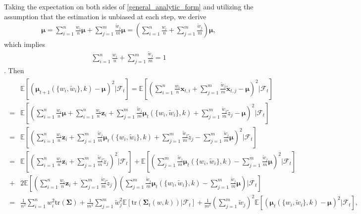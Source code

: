 Taking the expectation on both sides of \eqref{general_analytic_form} and utilizing the assumption that the estimation is unbiased at each step, we derive
\begin{align*}
\boldsymbol{\mu} = \sum_{i=1}^{n} \frac{w_i}{n} \boldsymbol{\mu} + \sum_{j=1}^{m} \frac{\widetilde{w}_j}{m} \boldsymbol{\mu}=(\sum_{i=1}^{n}\frac{w_i}{n}+\sum_{j=1}^{m}\frac{\widetilde{w}_j}{m})\boldsymbol{\mu},
\end{align*}
which implies 
\begin{align}
\label{unbiased_corollary}
\sum_{i=1}^{n}\frac{w_i}{n}+\sum_{j=1}^{m}\frac{\widetilde{w}_j}{m}=1
\end{align}.
Then 
\begin{align}
\label{general_stepbystep_cal}
\begin{split}
& \mathbb{E}[(\bm{\mu}_{t+1}(\{{w}_i, \widetilde{w}_i\}, k)-\bm{\mu})^2|\mathcal{F}_t]=\mathbb{E}[(\sum_{i=1}^{n}\frac{w_i}{n}\boldsymbol{x}_{t,i}+\sum_{j=1}^{m}\frac{\widetilde{w}_j}{m}\widetilde{\boldsymbol{x}}_{t,j}-\bm{\mu})^2|\mathcal{F}_t] \\ 
=& \mathbb{E}[(\sum_{i=1}^{n}\frac{w_i}{n}\boldsymbol{\mu}+\sum_{i=1}^{n}\frac{w_i}{n}\boldsymbol{z}_i+\sum_{j=1}^{m}\frac{\widetilde{w}_j}{m}{\boldsymbol{\mu}}_{t}(\{w_i,\widetilde{w}_i\},k)+\sum_{j=1}^{m}\frac{\widetilde{w}_j}{m}\widetilde{z}_j-\bm{\mu})^2|\mathcal{F}_t] \\
=&\mathbb{E}[(\sum_{i=1}^{n}\frac{w_i}{n}\boldsymbol{z}_i+\sum_{j=1}^{m}\frac{\widetilde{w}_j}{m}{\boldsymbol{\mu}}_{t}(\{w_i,\widetilde{w}_i\},k)+\sum_{j=1}^{m}\frac{\widetilde{w}_j}{m}\widetilde{z}_j-\sum_{j=1}^{m}\frac{\widetilde{w}_j}{m}\bm{\mu})^2|\mathcal{F}_t] \\=& \mathbb{E}[(\sum_{i=1}^{n}\frac{w_i}{n}\boldsymbol{z}_i+\sum_{j=1}^{m}\frac{\widetilde{w}_j}{m}\widetilde{z}_j)^2|\mathcal{F}_t]+\mathbb{E}[(\sum_{j=1}^{m}\frac{\widetilde{w}_j}{m}{\boldsymbol{\mu}}_{t}(\{w_i,\widetilde{w}_i\},k)-\sum_{j=1}^{m}\frac{\widetilde{w}_j}{m}{\boldsymbol{\mu}})^2|\mathcal{F}_t]\\+&2\mathbb{E}[(\sum_{i=1}^{n}\frac{w_i}{n}\boldsymbol{z}_i+\sum_{j=1}^{m}\frac{\widetilde{w}_j}{m}\widetilde{z}_j)(\sum_{j=1}^{m}\frac{\widetilde{w}_j}{m}{\boldsymbol{\mu}}_{t}(\{w_i,\widetilde{w}_i\},k)-\sum_{j=1}^{m}\frac{\widetilde{w}_j}{m}{\boldsymbol{\mu}})|\mathcal{F}_t] \\=&\frac{1}{n^2}\sum_{i=1}^{n}w_i^2\mathrm{tr}(\mathbf{\Sigma})+\frac{1}{m^2}\sum_{j=1}^{m}\widetilde{w}_j^2\mathbb{E}[\mathrm{tr}(\mathbf{\Sigma}_t(w,k))|\mathcal{F}_t]+\frac{1}{m^2}(\sum_{j=1}^{m}\widetilde{w}_j)^2\mathbb{E}[(\bm{\mu}_{t}(\{{w}_i, \widetilde{w}_i\}, k)-\bm{\mu})^2|\mathcal{F}_t],
\end{split}
\end{align}
